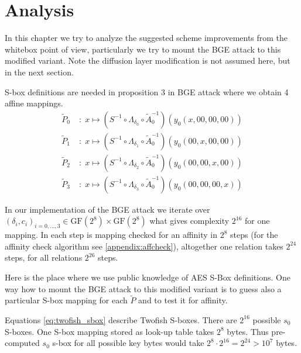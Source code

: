 \documentclass[11pt,oneside,final]{fithesis2}
\newcommand{\gfe}{\ensuremath{\text{GF}\left(2^8\right)}}
\begin{document}
    \section{Analysis}\label{sec:improvement_analysis}
    In this chapter we try to analyze the suggested scheme improvements from the whitebox point of view, particularly we try to mount the BGE attack to this modified variant. 
    Note the diffusion layer modification is not assumed here, but in the next section.

    S-box definitions are needed in proposition 3 in BGE attack where we obtain 4 affine mappings.
    \begin{subequations}\label{eq:BGE_prop3}
    \begin{align}
	\widetilde{P}_0 \;&: \; x \mapsto \left( S^{-1} \circ \Lambda_{\delta_0} \circ \widetilde{A}_0^{-1}\right) \left( y_0\left(x, 00, 00, 00\right) \right)\\
	\widetilde{P}_1 \;&: \; x \mapsto \left( S^{-1} \circ \Lambda_{\delta_1} \circ \widetilde{A}_0^{-1}\right) \left( y_0\left(00, x, 00, 00\right) \right)\\
	\widetilde{P}_2 \;&: \; x \mapsto \left( S^{-1} \circ \Lambda_{\delta_2} \circ \widetilde{A}_0^{-1}\right) \left( y_0\left(00, 00, x, 00\right) \right)\\
	\widetilde{P}_3 \;&: \; x \mapsto \left( S^{-1} \circ \Lambda_{\delta_3} \circ \widetilde{A}_0^{-1}\right) \left( y_0\left(00, 00, 00, x\right) \right)
    \end{align}
    \end{subequations}
    
    In our implementation of the BGE attack we iterate over $\left(\delta_i, c_i\right)_{i=0,\dots,3} \in \gfe \times \gfe$ what gives complexity $2^{16}$ for one mapping.
    In each step is mapping checked for an affinity in $2^8$ steps (for the affinity check algorithm see \ref{appendix:affcheck}), altogether one relation takes $2^{24}$ steps, for all relations
    $2^{26}$ steps.
    
    Here is the place where we use public knowledge of AES S-Box definitions. One way how to mount the BGE attack to this modified variant is to guess also a particular S-box
    mapping for each $\widetilde{P}$ and to test it for affinity. 
    
    Equations \ref{eq:twofish_sbox} describe Twofish S-boxes. There are $2^{16}$ possible $s_0$ S-boxes. One S-box mapping stored as look-up table takes $2^8$ bytes.
    Thus pre-computed $s_0$ s-box for all possible key bytes would take $2^8 \cdot 2^{16} = 2^{24} > 10^7$ bytes. 
    
\end{document}
